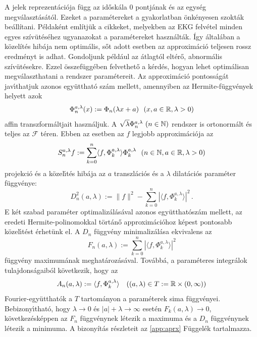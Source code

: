 \documentclass[oneside,titlepage,12pt,a4paper]{report}
\begin{document}
A jelek reprezent\'aci\'oja  f\"ugg az id\H osk\'ala $0$ pontj\'anak \'es az egys\'eg
megv\'alaszt\'as\'at\'ol. Ezeket a param\'etereket  a gyakorlatban \"onk\'enyesen szokták
 beállítani. Példaként említjük a \cite{hexp4, hexp5} cikkeket, melyekben az EKG felvétel minden egyes szívütéséhez ugyanazokat a paramétereket használták. Így általában a közelítés hibája nem optimális, sőt adott esetben az approximáció teljesen rossz eredményt is adhat. Gondoljunk például az átlagtól eltérő, abnormális szívütésekre. Ezzel \"osszef\"ugg\'eben felvethet\H o a k\'erd\'es, hogyan lehet optim\'alisan megv\'alaszthatani a rendszer paramétereit.
Az  approxim\'aci\'o pontoss\'ag\'at jav\'\i thatjuk azonos egy\"utthat\'o sz\'am mellett, amennyiben az  Hermite-f\"uggv\'enyek helyett azok
\begin{equation}
\Phi_n^{a,\lambda}(x):=\Phi_n(\lambda x+a)\ \  (x,a\in\Bbb R, \lambda>0)
\end{equation}
affin transzform\'altjait haszn\'aljuk. A $\sqrt{\lambda}\Phi_n^{a,\lambda}\ (n\in\Bbb N)$ rendszer is ortonorm\'alt \'es teljes az $\mathcal F$ t\'eren. Ebben az esetben
az $f$ legjobb approxim\'aci\'oja az
\begin{equation}
S_n^{a,\lambda}f:=\sum_{k=0}^n\langle f,\Phi_k^{a,\lambda}\rangle\Phi_k^{a,\lambda}\ \
(n\in\Bbb N, a\in\Bbb R,\lambda>0)
\label{eq:hilaprx}
\end{equation}
projekci\'o \'es a k\"ozel\'\i t\'es hib\'aja az $a$ transzl\'aci\'os \'es a $\lambda$ dilat\'aci\'os param\'eter f\"uggv\'enye:
\begin{equation*}
D^2_n(a,\lambda):=\|f\|^2-\sum_{k=0}^n|\langle f,\Phi_k^{a,\lambda}\rangle|^2\,.
\end{equation*}
E k\'et szabad param\'eter optimaliz\'al\'as\'aval azonos egy\"utthat\'osz\'am mellett, az eredeti Hermite-polinomokkal t\"ort\'an\H o  approxim\'aci\'ohoz k\'epest pontosabb k\"ozel\'\i t\'est \'erhet\"unk el. A $D_n$ f\"uggv\'eny minimaliz\'al\'asa ekvivalens  az
\begin{equation}
 F_n(a,\lambda):=\sum_{k=0}^n|\langle f,\Phi_k^{a,\lambda}\rangle|^2
\label{eq:Fnfuggv}
\end{equation}
 f\"uggv\'eny maximum\'anak meghat\'aroz\'as\'aval. Továbbá, a param\'eteres integr\'alok tulajdons\'agaib\'ol k\"ovetkezik, hogy az
\begin{equation*}
 A_n(a,\lambda):=\langle f,\Phi_k^{a,\lambda}\rangle \quad  ((a,\lambda)\in T:=\Bbb R\times (0,\infty))
\end{equation*}
 Fourier-egy\"utthat\'ok a $T$ tartom\'anyon a param\'eterek sima f\"uggv\'enyei. Bebizony\'\i that\'o, hogy $\lambda\to 0$ \'es $|a|+\lambda\to \infty$ eset\'en
 $F_k(a,\lambda)\to 0$, k\"ovetkez\'esk\'eppen az $F_n$ f\"uggv\'enynek l\'etezik a
 maximuma \'es a $D_n$ f\"uggv\'enynek l\'etezik a minimuma. A bizonyítás részleteit az \ref{app:aprx} F\"uggel\'ek tartalmazza. 
\end{document}
